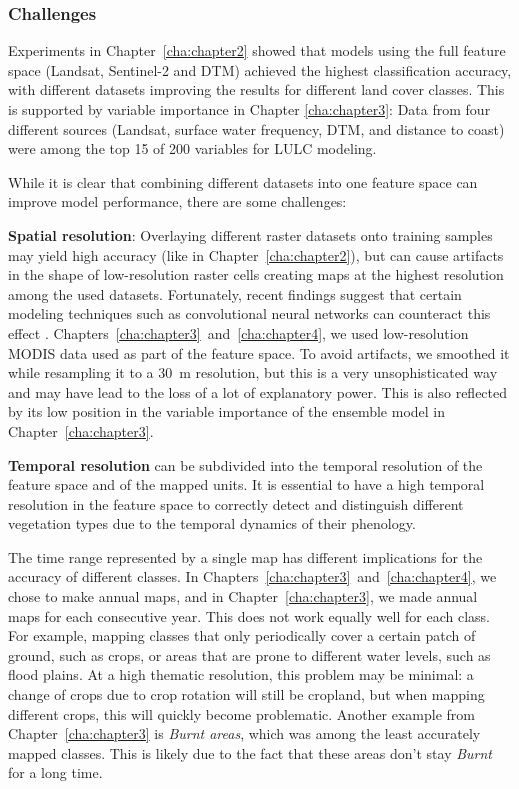         \subsubsection{Challenges}
            
            Experiments in Chapter\@~\ref{cha:chapter2} showed that models using the full feature space (Landsat, Sentinel-2 and DTM) achieved the highest classification accuracy, with different datasets improving the results for different land cover classes. This is supported by variable importance in Chapter \ref{cha:chapter3}: Data from four different sources (Landsat, surface water frequency, DTM, and distance to coast) were among the top 15 of 200 variables for LULC modeling.
            
            While it is clear that combining different datasets into one feature space can improve model performance, there are some challenges:
    
            \textbf{Spatial resolution}: Overlaying different raster datasets onto training samples may yield high accuracy (like in Chapter\@~\ref{cha:chapter2}), but can cause artifacts in the shape of low-resolution raster cells creating maps at the highest resolution among the used datasets. Fortunately, recent findings suggest that certain modeling techniques such as convolutional neural networks can counteract this effect \citep{robinson2019large}. Chapters\@~\ref{cha:chapter3}\@~and\@~\ref{cha:chapter4}, we used low-resolution MODIS data used as part of the feature space. To avoid artifacts, we smoothed it while resampling it to a 30~m resolution, but this is a very unsophisticated way and may have lead to the loss of a lot of explanatory power. This is also reflected by its low position in the variable importance of the ensemble model in Chapter\@~\ref{cha:chapter3}.

            \textbf{Temporal resolution} can be subdivided into the temporal resolution of the feature space and of the mapped units. It is essential to have a high temporal resolution in the feature space to correctly detect and distinguish different vegetation types due to the temporal dynamics of their phenology. 
            
            The time range represented by a single map has different implications for the accuracy of different classes. In Chapters\@~\ref{cha:chapter3}\@~and\@~\ref{cha:chapter4}, we chose to make annual maps, and in Chapter\@~\ref{cha:chapter3}, we made annual maps for each consecutive year. This does not work equally well for each class. For example, mapping classes that only periodically cover a certain patch of ground, such as crops, or areas that are prone to different water levels, such as flood plains. At a high thematic resolution, this problem may be minimal: a change of crops due to crop rotation will still be cropland, but when mapping different crops, this will quickly become problematic. Another example from Chapter\@~\ref{cha:chapter3} is \textit{Burnt areas}, which was among the least accurately mapped classes. This is likely due to the fact that these areas don't stay \textit{Burnt} for a long time.

